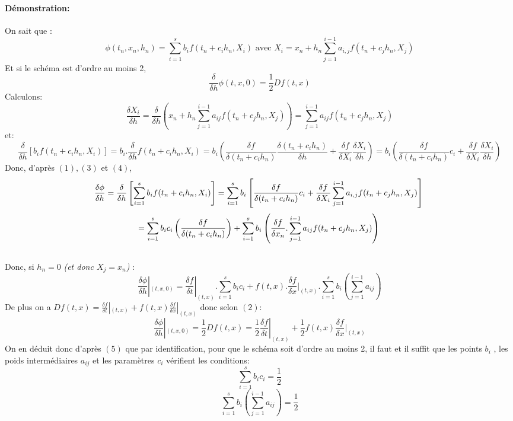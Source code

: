 \documentclass[a4paper,12pt,landscape]{article}
\begin{document}
\paragraph{Démonstration:} On sait que : 
\begin{equation}\phi(t_n,x_n,h_n)=\sum_{i=1}^{s} b_i f(t_n+c_i h_n,X_i) \textrm{ avec } X_i=x_n+h_n\sum^{i-1}_{j=1} a_{i,j} f(t_n+c_jh_n,X_j)
\end{equation}
Et si le schéma est d'ordre au moins 2, 
\begin{equation}\frac{\delta}{\delta h}\phi(t,x,0)=\frac{1}{2}Df(t,x)
\end{equation}
Calculons:
\begin{equation}\frac{\delta X_i}{\delta h}=\frac{\delta}{\delta h}(x_n+h_n\sum^{i-1}_{j=1} a_{ij} f(t_n+c_jh_n,X_j))=\sum^{i-1}_{j=1} a_{ij} f(t_n+c_jh_n,X_j)
\end{equation}
et:
\begin{equation}
\frac{\delta}{\delta h}\left[ b_if(t_n+c_ih_n,X_i)\right] = b_i . \frac{\delta}{\delta h}f(t_n+c_ih_n,X_i)= b_i \left( \frac{\delta f}{\delta (t_n+c_ih_n)}\frac{\delta (t_n+c_ih_n)}{\delta h}+\frac{\delta f}{\delta X_i}\frac{\delta X_i}{\delta h}\right)= b_i \left( \frac{\delta f}{\delta (t_n+c_ih_n)}c_i+\frac{\delta f}{\delta X_i}\frac{\delta X_i}{\delta h}\right)
\end{equation}
Donc, d'après $(1), (3)$ et $(4)$,
$$ \frac{\delta \phi}{\delta h} = \frac{\delta}{\delta h}\left[ \sum^{s}_{i=1} b_i f(t_n+c_i h_n,X_i)\right] = \sum^{s}_{i=1} b_i\left[ \frac{\delta f}{\delta (t_n+c_ih_n)}c_i+\frac{\delta f}{\delta X_i}\sum^{i-1}_{j=1} a_{i,j} f(t_n+c_jh_n,X_j) \right]\\ $$
$$= \sum^{s}_{i=1} b_ic_i\left( \frac{\delta f}{\delta (t_n+c_ih_n)}\right) +\sum^{s}_{i=1} b_i \left( \frac{\delta f}{\delta x_n}.\sum^{i-1}_{j=1} a_{ij} f(t_n+c_jh_n,X_j) \right)\\ $$
\\
Donc, si $h_n=0$ \textit{(et donc $X_j=x_n$)} :
\begin{equation}
\frac{\delta \phi}{\delta h}|_{(t,x,0)} = \frac{\delta f}{\delta t}|_{(t,x)}.\sum^{s}_{i=1} b_ic_i +  f(t,x).\frac{\delta f}{\delta x}|_{(t,x)}.\sum^{s}_{i=1} b_i\left(\sum^{i-1}_{j=1} a_{ij}\right)
\end{equation}
De plus on a $Df(t,x)=\frac{\delta f}{\delta t}|_{(t,x)}+f(t,x)\frac{\delta f}{\delta x}|_{(t,x)}$ donc selon $(2)$:
$$\frac{\delta \phi}{\delta h}|_{(t,x,0)}=\frac{1}{2}Df(t,x)= \frac{1}{2}\frac{\delta f}{\delta t}|_{(t,x)}+\frac{1}{2}f(t,x) \frac{\delta f}{\delta x}|_{(t,x)}$$
On en déduit donc d'après $(5)$ que par identification, pour que le schéma soit d'ordre au moins 2, il faut et
il suffit que les points $b_i$ , les poids intermédiaires $a_{ij}$ et les paramètres $c_i$
vérifient les conditions: 
$$\sum^{s}_{i=1} b_ic_i = \frac{1}{2}$$
$$\sum^{s}_{i=1} b_i \left(\sum^{i-1}_{j=1} a_{ij}\right) = \frac{1}{2}$$
\end{document}
